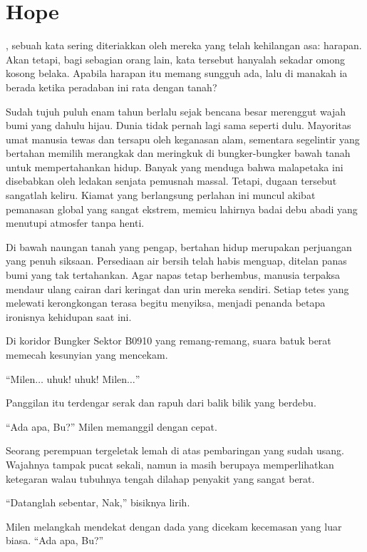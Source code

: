 \chapter*{Hope}

, sebuah kata sering diteriakkan oleh mereka yang telah kehilangan asa: harapan. Akan tetapi, bagi sebagian orang lain, kata tersebut hanyalah sekadar omong kosong belaka. Apabila harapan itu memang sungguh ada, lalu di manakah ia berada ketika peradaban ini rata dengan tanah?

Sudah tujuh puluh enam tahun berlalu sejak bencana besar merenggut wajah bumi yang dahulu hijau. Dunia tidak pernah lagi sama seperti dulu. Mayoritas umat manusia tewas dan tersapu oleh keganasan alam, sementara segelintir yang bertahan memilih merangkak dan meringkuk di bungker-bungker bawah tanah untuk mempertahankan hidup. Banyak yang menduga bahwa malapetaka ini disebabkan oleh ledakan senjata pemusnah massal. Tetapi, dugaan tersebut sangatlah keliru. Kiamat yang berlangsung perlahan ini muncul akibat pemanasan global yang sangat ekstrem, memicu lahirnya badai debu abadi yang menutupi atmosfer tanpa henti.

Di bawah naungan tanah yang pengap, bertahan hidup merupakan perjuangan yang penuh siksaan. Persediaan air bersih telah habis menguap, ditelan panas bumi yang tak tertahankan. Agar napas tetap berhembus, manusia terpaksa mendaur ulang cairan dari keringat dan urin mereka sendiri. Setiap tetes yang melewati kerongkongan terasa begitu menyiksa, menjadi penanda betapa ironisnya kehidupan saat ini.

Di koridor Bungker Sektor B0910 yang remang-remang, suara batuk berat memecah kesunyian yang mencekam.

``Milen$\dots$ uhuk! uhuk! Milen$\dots$''

Panggilan itu terdengar serak dan rapuh dari balik bilik yang berdebu.

``Ada apa, Bu?'' Milen memanggil dengan cepat.

Seorang perempuan tergeletak lemah di atas pembaringan yang sudah usang. Wajahnya tampak pucat sekali, namun ia masih berupaya memperlihatkan ketegaran walau tubuhnya tengah dilahap penyakit yang sangat berat.

``Datanglah sebentar, Nak,'' bisiknya lirih.

Milen melangkah mendekat dengan dada yang dicekam kecemasan yang luar biasa. ``Ada apa, Bu?''

